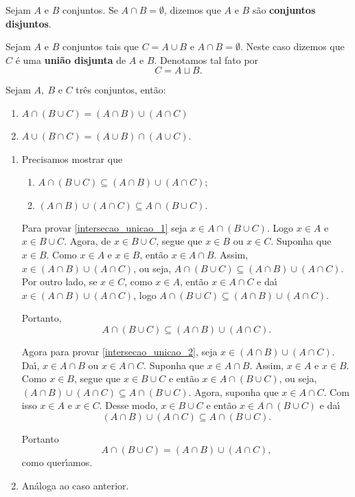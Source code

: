\begin{definicao}
    Sejam $A$ e $B$ conjuntos. Se $A \cap B = \emptyset$, dizemos que $A$ e $B$ s{\~a}o \textbf{conjuntos disjuntos}.
\end{definicao}


Sejam $A$ e $B$ conjuntos tais que $C = A \cup B$ e $A \cap B = \emptyset$. Neste caso dizemos que $C$ {\'e} uma \textbf{uni{\~a}o disjunta} de $A$ e $B$. Denotamos tal fato por
\[
    C = A \sqcup B.
\]

\begin{proposicao} Sejam $A,\ B$ e $C$ tr{\^e}s conjuntos, ent{\~a}o:
    \begin{enumerate}[label={\roman*})]
        \item $A \cap (B \cup C) = (A \cap B) \cup (A \cap C)$
        \item $A \cup (B \cap C) = (A \cup B) \cap (A \cup C)$.
    \end{enumerate}
\end{proposicao}
\begin{prova}
    \begin{enumerate}[label={\roman*})]
        \item Precisamos mostrar que
        \begin{enumerate}[label=({\arabic*})]
            \item $A\cap(B\cup C)\subseteq(A\cap B)\cup(A\cap C)$;\label{intersecao_unicao_1}
            \item $(A\cap B)\cup(A\cap C)\subseteq A\cap(B\cup C).$\label{intersecao_unicao_2}
        \end{enumerate}

        Para provar \ref{intersecao_unicao_1} seja $x\in A \cap (B \cup C)$. Logo $x\in A$ e $x\in B\cup C$. Agora, de $x\in B\cup C$, segue que $x\in B$ ou $x\in C$. Suponha que $x\in B$. Como $x\in A$ e $x \in B$, ent\~ao $x\in A\cap B$. Assim, $x\in(A\cap B)\cup(A\cap C)$, ou seja, $A\cap(B\cup C)\subseteq(A\cap B)\cup(A\cap C)$. Por outro lado, se $x\in C$, como $x\in A$, ent{\~a}o $x\in A\cap C$ e da{\'\i} $x\in(A\cap B)\cup(A\cap C)$, logo $A\cap(B\cup C)\subseteq(A\cap B)\cup(A\cap C)$.

        Portanto,
        \[
            A\cap(B\cup C)\subseteq(A\cap B)\cup(A\cap C).
        \]

        Agora para provar \ref{intersecao_unicao_2}, seja $x\in(A\cap B)\cup(A\cap C)$. Da{\'\i}, $x\in A\cap B$ ou $x\in A\cap C$. Suponha que $x\in A\cap B$. Assim, $x\in A$ e $x\in B$. Como $x\in B$, segue que $x\in B\cup C$ e ent{\~a}o $x\in A\cap(B\cup C)$, ou seja, $(A\cap B)\cup(A\cap C)\subseteq A\cap(B\cup C)$. Agora, suponha que $x\in A\cap C$. Com isso $x\in A$ e $x\in C$. Desse modo, $x\in B\cup C$ e ent{\~a}o $x\in A\cap(B\cup C)$ e da{\'\i}
        \[
            (A\cap B)\cup(A\cap C)\subseteq A\cap(B\cup C).
        \]

        Portanto
        \[
            A\cap(B\cup C)=(A\cap B)\cup(A\cap C),
        \]
        como quer{\'\i}amos.
        \item An\'aloga ao caso anterior.
    \end{enumerate}
\end{prova}

